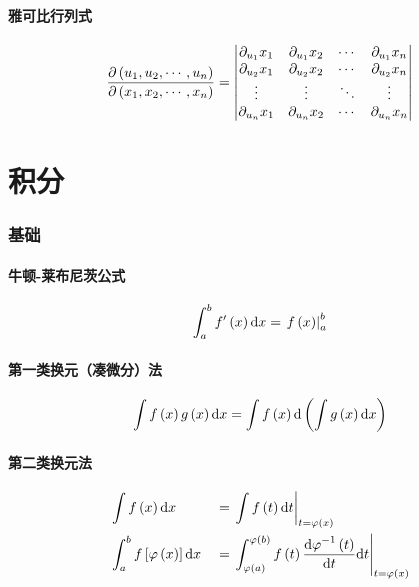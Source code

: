 \documentclass{article}
\begin{document}
\subsection{雅可比行列式}

\[\frac{\partial\left(u_1,u_2,\cdots,u_n\right)}
    {\partial\left(x_1,x_2,\cdots,x_n\right)}=
    \begin{vmatrix}
        \partial_{u_1}x_1 & \partial_{u_1}x_2 &
        \cdots            & \partial_{u_1}x_n                   \\
        \partial_{u_2}x_1 & \partial_{u_2}x_2 &
        \cdots            & \partial_{u_2}x_n                   \\
        \vdots            & \vdots            & \ddots & \vdots \\
        \partial_{u_n}x_1 & \partial_{u_n}x_2 &
        \cdots            & \partial_{u_n}x_n
    \end{vmatrix}\]

\part{积分}

\section{基础}

\subsection{牛顿-莱布尼茨公式}

\[\int_a^b{f^\prime\left(x\right)\mathrm d x}=\left.f\left(x\right)\right|_a^b\]

\subsection{第一类换元（凑微分）法}

\[\int f\left(x\right)g\left(x\right)\mathrm d x=\int f\left(x\right)\mathrm d\left(\int g\left(x\right)\mathrm d x\right)\]

\subsection{第二类换元法}

\[\begin{aligned}
         & \int f\left(x\right)\mathrm d x                        &  & =\left.\int f\left(t\right)\mathrm d t\right|_{t=\varphi\left(x\right)}                                                                \\
         & \int_a^bf\left[\varphi\left(x\right)\right]\mathrm d x &  & =\left.\int_{\varphi\left(a\right)}^{\varphi\left(b\right)}{f\left(t\right)\frac{{\mathrm d\varphi}^{-1}\left(t\right)}{ \mathrm d t}\mathrm d t}\right|_{t=\varphi\left(x\right)}
    \end{aligned}\]
\end{document}
